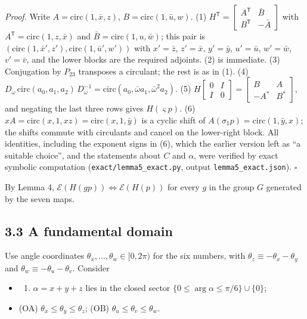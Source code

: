\documentclass[
  11pt,
]{article}
\providecommand{\tightlist}{%
  \setlength{\itemsep}{0pt}\setlength{\parskip}{0pt}}
\begin{document}
\emph{Proof.} Write \(A=\mathrm{circ}(1,\bar x,z)\),
\(B=\mathrm{circ}(1,\bar u,w)\). (1)
\(H^{\mathsf T}=\begin{bmatrix}A^{\mathsf T}&\bar B\\ B^{\mathsf T}&-\bar A\end{bmatrix}\)
with \(A^{\mathsf T}=\mathrm{circ}(1,z,\bar x)\) and
\(\bar B=\mathrm{circ}(1,u,\bar w)\); this pair is
\((\mathrm{circ}(1,\bar x',z'),\mathrm{circ}(1,\bar u',w'))\) with
\(x'=\bar z\), \(z'=\bar x\), \(y'=\bar y\), \(u'=\bar u\),
\(w'=\bar w\), \(v'=\bar v\), and the lower blocks are the required
adjoints. (2) is immediate. (3) Conjugation by \(P_{23}\) transposes a
circulant; the rest is as in (1). (4)
\(D_\omega\,\mathrm{circ}(a_0,a_1,a_2)\,D_\omega^{-1}=\mathrm{circ}(a_0,\bar\omega a_1,\bar\omega^2a_2)\).
(5)
\(H\begin{bmatrix}0&I\\I&0\end{bmatrix}=\begin{bmatrix}B&A\\-A^*&B^*\end{bmatrix}\),
and negating the last three rows gives \(H(\varsigma p)\). (6)
\(xA=\mathrm{circ}(x,1,xz)=\mathrm{circ}(x,1,\bar y)\) is a cyclic shift
of \(A(\sigma_1p)=\mathrm{circ}(1,\bar y,x)\); the shifts commute with
circulants and cancel on the lower-right block. All identities,
including the exponent signs in (6), which the earlier version left as
``a suitable choice'', and the statements about \(C\) and \(\alpha\),
were verified by exact symbolic computation
(\texttt{exact/lemma5\_exact.py}, output \texttt{lemma5\_exact.json}).
\(\square\)

By Lemma 4, \(\mathcal E(H(gp))\iff\mathcal E(H(p))\) for every \(g\) in
the group \(G\) generated by the seven maps.

\subsection{3.3 A fundamental domain}\label{a-fundamental-domain}

Use angle coordinates \(\theta_x,\dots,\theta_w\in[0,2\pi)\) for the six
numbers, with \(\theta_z\equiv-\theta_x-\theta_y\) and
\(\theta_w\equiv-\theta_u-\theta_v\). Consider

\begin{itemize}
\tightlist
\item
  \begin{enumerate}
  \def\labelenumi{(\Alph{enumi})}
  \setcounter{enumi}{18}
  \tightlist
  \item
    \(\alpha=x+y+z\) lies in the closed sector
    \(\{0\le\arg\alpha\le\pi/6\}\cup\{0\}\);
  \end{enumerate}
\item
  (OA) \(\theta_x\le\theta_y\le\theta_z\); (OB)
  \(\theta_u\le\theta_v\le\theta_w\).
\end{itemize}
\end{document}
